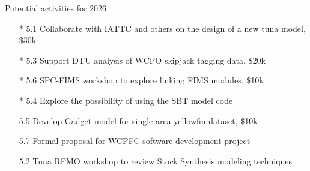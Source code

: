 \documentclass[aspectratio=169,fleqn]{beamer}
\begin{document}
\begin{frame}{Potential activities for 2026}
  \begin{itemize}
    \item[* 5.1] Collaborate with IATTC and others on the design of a new tuna model, \$30k\\
    \item[* 5.3] Support DTU analysis of WCPO skipjack tagging data, \$20k\\
    \item[* 5.6] SPC-FIMS workshop to explore linking FIMS modules, \$10k\\
    \item[* 5.4] Explore the possibility of using the SBT model code\\[3ex]
    \item[5.5] Develop Gadget model for single-area yellowfin dataset, \$10k\\
    \item[5.7] Formal proposal for WCPFC software development project\\[3ex]
    \item[5.2] Tuna RFMO workshop to review Stock Synthesis modeling techniques\\
  \end{itemize}
\end{frame}
\end{document}
